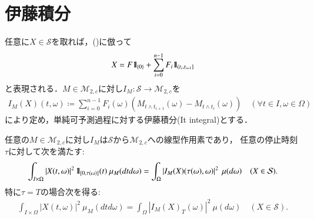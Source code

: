 \section{伊藤積分}
	
	\begin{screen}
		\begin{dfn}[単純可予測過程に対する伊藤積分]
			任意に$X \in \mathcal{S}$を取れば，()に倣って
			\begin{align}
				X = F \mbox{1}\hspace{-0.25em}\mbox{l}_{\{0\}} + \sum_{i=0}^{n-1} F_i \mbox{1}\hspace{-0.25em}\mbox{l}_{\left(t_i,t_{i+1}\right]}
				\label{eq:dfn_Ito_integral_simple_predictable_process}
			\end{align}
			と表現される．$M \in \mathcal{M}_{2,c}$に対し$I_M:\mathcal{S} \rightarrow \mathcal{M}_{2,c}$を
			\begin{align}
				I_M(X)(t,\omega) \coloneqq \sum_{i=0}^{n-1} F_i(\omega) \left(M_{t \wedge t_{i+1}}(\omega) - M_{t \wedge t_i}(\omega)\right)
				\quad (\forall t \in I,\omega \in \Omega)
			\end{align}
			により定め，単純可予測過程に対する伊藤積分(It integral)とする．
			\label{dfn:Ito_integral_simple_predictable_process}
		\end{dfn}
	\end{screen}
	
	\begin{screen}
		\begin{thm}[単純可予測過程に対する伊藤積分の線型等長性]
			任意の$M \in \mathcal{M}_{2,c}$に対し$I_M$は$\mathcal{S}$から$\mathcal{M}_{2,c}$への線型作用素であり，
			任意の停止時刻$\tau$に対して次を満たす:
			\begin{align}
				\int_{I \times \Omega} \left| X(t,\omega) \right|^2 \mbox{1}\hspace{-0.25em}\mbox{l}_{[0,\tau(\omega)]}(t)\ \mu_M(dtd\omega)
				= \int_\Omega \left| I_M(X)(\tau(\omega),\omega) \right|^2\ \mu(d\omega)
				\quad (X \in \mathcal{S}).
				\label{eq:thm_Ito_integral_linearity_isometric}
			\end{align}
			特に$\tau = T$の場合次を得る:
			\begin{align}
				\int_{I \times \Omega} \left| X(t,\omega) \right|^2\ \mu_M(dtd\omega)
				= \int_\Omega \left| I_M(X)_T(\omega) \right|^2\ \mu(d\omega)
				\quad (X \in \mathcal{S}).
				\label{eq:thm_Ito_integral_linearity_isometric_3}
			\end{align}
			\label{thm:Ito_integral_linearity_isometric}
		\end{thm}
	\end{screen}
	

